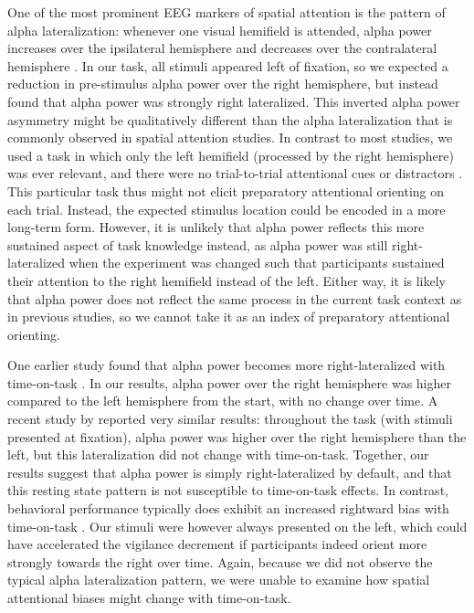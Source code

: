 \documentclass[11pt,english,]{memoir}
\begin{document}
One of the most prominent EEG markers of spatial attention is the pattern of alpha lateralization: whenever one visual hemifield is attended, alpha power increases over the ipsilateral hemisphere and decreases over the contralateral hemisphere \autocite{Klimesch2012}. In our task, all stimuli appeared left of fixation, so we expected a reduction in pre-stimulus alpha power over the right hemisphere, but instead found that alpha power was strongly right lateralized. This inverted alpha power asymmetry might be qualitatively different than the alpha lateralization that is commonly observed in spatial attention studies. In contrast to most studies, we used a task in which only the left hemifield (processed by the right hemisphere) was ever relevant, and there were no trial-to-trial attentional cues or distractors \autocites{Rihs2009}{Slagter2016}. This particular task thus might not elicit preparatory attentional orienting on each trial. Instead, the expected stimulus location could be encoded in a more long-term form. However, it is unlikely that alpha power reflects this more sustained aspect of task knowledge instead, as alpha power was still right-lateralized when the experiment was changed such that participants sustained their attention to the right hemifield \autocite{Slagter2016} instead of the left. Either way, it is likely that alpha power does not reflect the same process in the current task context as in previous studies, so we cannot take it as an index of preparatory attentional orienting.

One earlier study found that alpha power becomes more right-lateralized with time-on-task \autocite{Newman2013}. In our results, alpha power over the right hemisphere was higher compared to the left hemisphere from the start, with no change over time. A recent study by \textcite{Benwell2018} reported very similar results: throughout the task (with stimuli presented at fixation), alpha power was higher over the right hemisphere than the left, but this lateralization did not change with time-on-task. Together, our results suggest that alpha power is simply right-lateralized by default, and that this resting state pattern is not susceptible to time-on-task effects. In contrast, behavioral performance typically does exhibit an increased rightward bias with time-on-task \autocites{Benwell2013}{Dufour2007}{Manly2005}. Our stimuli were however always presented on the left, which could have accelerated the vigilance decrement if participants indeed orient more strongly towards the right over time. Again, because we did not observe the typical alpha lateralization pattern, we were unable to examine how spatial attentional biases might change with time-on-task.
\end{document}
